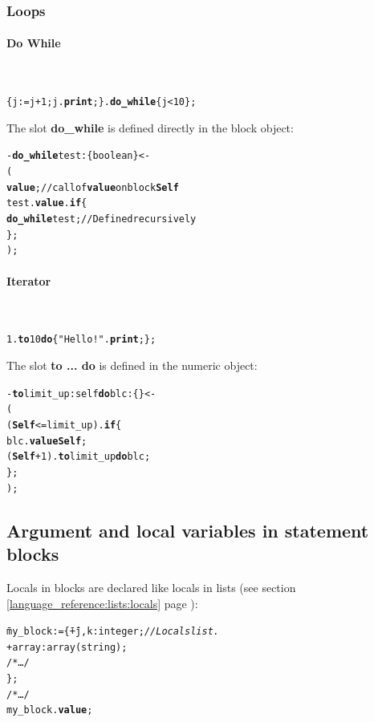 \documentclass[11pt]{mybook}
\begin{document}
\subsubsection{Loops}
\label{language_reference:blocks:use:loops}
\paragraph{Do While} 
~\\
\begin{alltt}
   \{ j := j + 1; j.{\bf{}print};\}.{\bf{}do\_while} \{j<10\};
\end{alltt}
The slot {\bf{}do\_while} is defined directly in the {\sc{}block} object:
\begin{alltt}
  - {\bf{}do\_while} test:{\sc{}\{ boolean \}} <-
  (    
    {\bf{}value};             // call of {\bf{}value} on {\sc{}block} {\bf{}Self}
    test.{\bf{}value}.{\bf{}if} \{
      {\bf{}do\_while} test;   // Defined recursively
    \};
  );
\end{alltt}

\paragraph{Iterator}
~\\
\begin{alltt}
  1.{\bf{}to} 10 {\bf{}do} \{"Hello!".{\bf{}print};\};
\end{alltt}
The slot {\bf{}to ... do} is defined in the {\sc{}numeric} object:
\begin{alltt}
  - {\bf{}to} limit_up:{\sc{}self} {\bf{}do} blc:{\sc{}\{ \}} <-
  (
    ({\bf{}Self}<=limit_up).{\bf{}if} \{
      blc.{\bf{}value} {\bf{}Self};
      ({\bf{}Self} + 1).{\bf{}to} limit_up {\bf{}do} blc;
    \};
  );
\end{alltt}
\subsection{Argument and local variables in statement blocks}
\label{language_reference:blocks:locals}
Locals in blocks are declared like locals in lists (see section
\ref{language_reference:lists:locals} page \pageref{language_reference:lists:locals}):
\begin{alltt}
\begin{tabbing}
  \=my\_block := \= \{ \= + j,k:{\sc{}integer};   {\it{}// Locals list.} \\
  \>             \>    \> + array:{\sc{}array}({\sc{}string}); \\
  \>             \>    \> /* \ldots */ \\
  \>             \>\}; \\
  \>/* \ldots */\\
  \>my\_block.{\bf{}value};\\
\end{tabbing}
\end{alltt}
\end{document}

